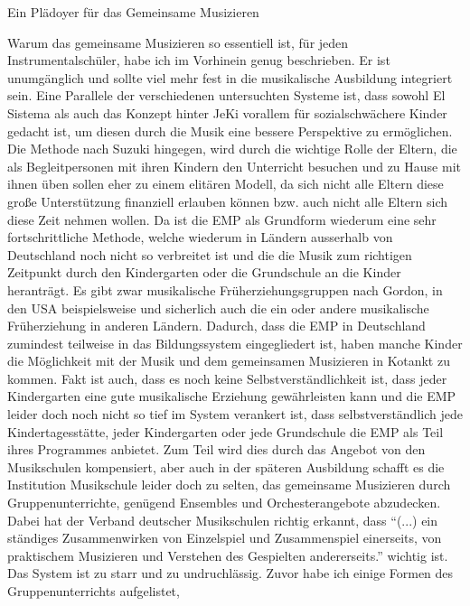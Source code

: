 Ein Plädoyer für das Gemeinsame Musizieren

Warum das gemeinsame Musizieren so essentiell ist, für jeden
Instrumentalschüler, habe ich im Vorhinein genug beschrieben. Er ist
unumgänglich und sollte viel mehr fest in die musikalische Ausbildung integriert
sein. Eine Parallele der verschiedenen untersuchten Systeme ist, dass sowohl El
Sistema als auch das Konzept hinter JeKi vorallem für sozialschwächere Kinder
gedacht ist, um diesen durch die Musik eine bessere Perspektive zu ermöglichen.
Die Methode nach Suzuki hingegen, wird durch die wichtige Rolle der Eltern, die
als Begleitpersonen mit ihren Kindern den Unterricht besuchen und zu Hause mit
ihnen üben sollen eher zu einem elitären Modell, da sich nicht alle Eltern diese
große Unterstützung finanziell erlauben können bzw. auch nicht alle Eltern sich
diese Zeit nehmen wollen. Da ist die EMP als Grundform wiederum eine sehr
fortschrittliche Methode, welche wiederum in Ländern ausserhalb von Deutschland
noch nicht so verbreitet ist und die die Musik zum richtigen Zeitpunkt durch den
Kindergarten oder die Grundschule an die Kinder heranträgt. Es gibt zwar
musikalische Früherziehungsgruppen nach Gordon, in den USA beispielsweise und
sicherlich auch die ein oder andere musikalische Früherziehung in anderen
Ländern. Dadurch, dass die EMP in Deutschland zumindest teilweise in das
Bildungssystem eingegliedert ist, haben manche Kinder die Möglichkeit mit der
Musik und dem gemeinsamen Musizieren in Kotankt zu kommen. Fakt ist auch, dass
es noch keine Selbstverständlichkeit ist, dass jeder Kindergarten eine gute
musikalische Erziehung gewährleisten kann und die EMP leider doch noch nicht so
tief im System verankert ist, dass selbstverständlich jede Kindertagesstätte,
jeder Kindergarten oder jede Grundschule die EMP als Teil ihres Programmes
anbietet. Zum Teil wird dies durch das Angebot von den Musikschulen kompensiert,
aber auch in der späteren Ausbildung schafft es die Institution Musikschule
leider doch zu selten, das gemeinsame Musizieren durch Gruppenunterrichte,
genügend Ensembles und Orchesterangebote abzudecken. Dabei hat der Verband
deutscher Musikschulen richtig erkannt, dass \enquote{(...) ein ständiges
Zusammenwirken von Einzelspiel und Zusammenspiel einerseits, von praktischem
Musizieren und Verstehen des Gespielten andererseits.} wichtig ist.
\autocite[22]{losert:die_kunst_zu_unterrichten} Das System ist zu starr und zu
undruchlässig. Zuvor habe ich einige Formen des Gruppenunterrichts aufgelistet,
